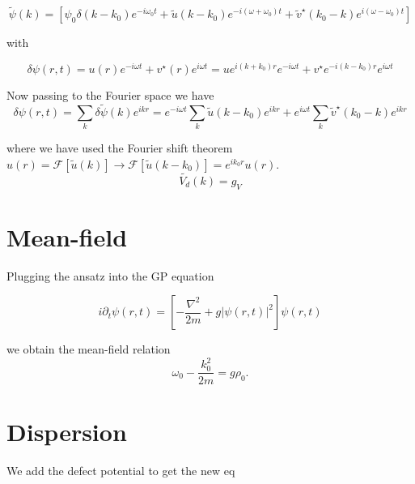 \documentclass[a4paper,prb,10pt,aps]{revtex4-1}
\begin{document}
 

\begin{equation}
  \label{eq:7}
\widetilde{\psi}(k)=\left[\psi_{0}\delta(k-k_{0})e^{-i\omega_{0}t}+\widetilde{u}(k-k_{0})e^{-i(\omega+\omega_{0})t}+\widetilde{v}^{\star}(k_{0}-k)e^{i(\omega-\omega_{0})t}\right]
\end{equation}




with

\begin{equation}
  \label{eq:8}
\delta\psi(r,t)=u(r)e^{-i\omega t}+v^{\star}(r)e^{i\omega t}=ue^{i(k+k_{0})r}e^{-i\omega t}+v^{\star}e^{-i(k-k_{0})r}e^{i\omega t}
\end{equation}



Now passing to the Fourier space we have
\begin{equation}
  \label{eq:9}
\delta\psi(r,t)=\sum_{k}\delta\widetilde{\psi}(k)e^{ikr}=e^{-i\omega t}\sum_{k}\widetilde{u}(k-k_{0})e^{ikr}+e^{i\omega t}\sum_{k}\widetilde{v}^{\star}(k_{0}-k)e^{ikr}
\end{equation}



where we have used the Fourier shift theorem $u(r)=\mathcal{F}[\tilde{u}(k)]\rightarrow\mathcal{F}[\tilde{u}(k-k_{0})]=e^{ik_{0}r}u(r)$. 
\begin{equation}
  \label{eq:10}
\widetilde{V_{d}}(k)=g_{V}
\end{equation}

\section{Mean-field}
Plugging the ansatz into the GP equation

\begin{equation}
  \label{eq:11}
i\partial_{t}\psi(r,t)=\left[-\frac{\nabla^{2}}{2m}+g\left|\psi(r,t)\right|^{2}\right]\psi(r,t)  
\end{equation}


we obtain the mean-field relation
\begin{equation}
  \label{eq:12}
\omega_{0}-\frac{k_{0}^{2}}{2m}=g\rho_{0}.  
\end{equation}

\section{Dispersion}

We add the defect potential to get the new eq
\end{document}
